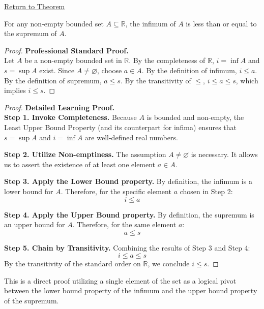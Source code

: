 \newpage
{}
\label{prf:infimum-less-than-supremum}

\begin{remark*}[Return]
\hyperref[thm:infimum-less-than-supremum]{Return to Theorem}
\end{remark*}

\begin{theorem*}
For any non-empty bounded set $A \subseteq \mathbb{R}$, the infimum of $A$ is less than or equal to the supremum of $A$.
\end{theorem*}

\begin{proof}
\textbf{Professional Standard Proof.}~\\
Let $A$ be a non-empty bounded set in $\mathbb{R}$. By the completeness of $\mathbb{R}$, $i = \inf A$ and $s = \sup A$ exist. Since $A \neq \varnothing$, choose $a \in A$. By the definition of infimum, $i \le a$. By the definition of supremum, $a \le s$. By the transitivity of $\le$, $i \le a \le s$, which implies $i \le s$.
\end{proof}

\begin{proof}
\textbf{Detailed Learning Proof.}~\\

\textbf{Step 1. Invoke Completeness.}
Because $A$ is bounded and non-empty, the Least Upper Bound Property (and its counterpart for infima) ensures that $s = \sup A$ and $i = \inf A$ are well-defined real numbers.

\textbf{Step 2. Utilize Non-emptiness.}
The assumption $A \neq \varnothing$ is necessary. It allows us to assert the existence of at least one element $a \in A$.

\textbf{Step 3. Apply the Lower Bound property.}
By definition, the infimum is a lower bound for $A$. Therefore, for the specific element $a$ chosen in Step 2:
\[ i \le a \]

\textbf{Step 4. Apply the Upper Bound property.}
By definition, the supremum is an upper bound for $A$. Therefore, for the same element $a$:
\[ a \le s \]

\textbf{Step 5. Chain by Transitivity.}
Combining the results of Step 3 and Step 4:
\[ i \le a \le s \]
By the transitivity of the standard order on $\mathbb{R}$, we conclude $i \le s$.
\end{proof}

\begin{remark*}
This is a direct proof utilizing a single element of the set as a logical pivot between the lower bound property of the infimum and the upper bound property of the supremum.
\end{remark*}

